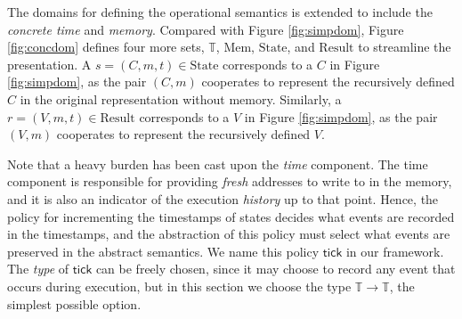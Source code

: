 \documentclass{article}
\theoremstyle{definition}
\newcommand*{\Time}{\mathbb{T}}
\newcommand*{\Mem}{\text{Mem}}
\newcommand*{\mem}{m}
\newcommand*{\State}{\text{State}}
\newcommand*{\Result}{\text{Result}}
\newcommand*{\tick}{\mathsf{tick}}
\begin{document}
The domains for defining the operational semantics is extended to include the \emph{concrete time} and \emph{memory}.
Compared with Figure \ref{fig:simpdom}, Figure \ref{fig:concdom} defines four more sets, $\Time$, $\Mem$, $\State$, and $\Result$ to streamline the presentation.
A $s=(C,\mem,t)\in\State$ corresponds to a $C$ in Figure \ref{fig:simpdom}, as the pair $(C,\mem)$ cooperates to represent the recursively defined $C$ in the original representation without memory.
Similarly, a $r=(V,\mem,t)\in\Result$ corresponds to a $V$ in Figure \ref{fig:simpdom}, as the pair $(V,\mem)$ cooperates to represent the recursively defined $V$.

Note that a heavy burden has been cast upon the \emph{time} component.
The time component is responsible for providing \emph{fresh} addresses to write to in the memory, and it is also an indicator of the execution \emph{history} up to that point.
Hence, the policy for incrementing the timestamps of states decides what events are recorded in the timestamps, and the abstraction of this policy must select what events are preserved in the abstract semantics.
We name this policy $\tick$ in our framework.
The \emph{type} of $\tick$ can be freely chosen, since it may choose to record any event that occurs during execution, but in this section we choose the type $\Time\rightarrow\Time$, the simplest possible option.
\end{document}
